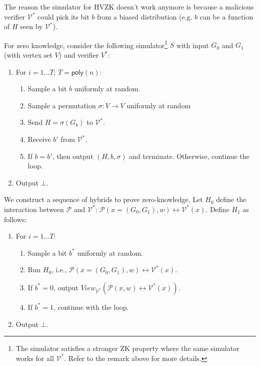 The reason the simulator for HVZK doesn't work anymore is because a malicious verifier $\mathcal{V^*}$ could pick its bit $b$ from a biased distribution (e.g. $b$ can be a function of $H$ seen by $\mathcal{V^*}$).

For zero knowledge, consider the following simulator\footnote{The simulator satisfies a stronger ZK property where the same simulator works for all $\mathcal{V^*}$. Refer to the remark above for more details.} $S$ with input $G_0$ and $G_1$ (with vertex set $V$) and verifier $V^*$:

\begin{enumerate}
\item For $i = 1\dots T$; $T=\mathsf{poly}(n)$:
\begin{enumerate}
	\item Sample a bit $b$ uniformly at random.

	\item Sample a permutation $\sigma: V \to V$ uniformly at random
	
	\item Send $H = \sigma (G_b)$ to $\mathcal{V^*}$.

	\item Receive $b'$ from $\mathcal{V^*}$.

	\item If $b=b'$, then output $(H, b, \sigma)$ and terminate. Otherwise, continue the loop.
\end{enumerate}
\item Output $\bot$.

\end{enumerate}

We construct a sequence of hybrids to prove zero-knowledge. Let $H_0$ define the interaction between $\mathcal{P}$ and $\mathcal{V^*}$: $\mathcal{P}(x=(G_0, G_1), w)\leftrightarrow \mathcal{V^*}(x)$. Define $H_1$ as follows: 
\begin{enumerate}
	\item For $i = 1\dots T$:
\begin{enumerate}
	\item Sample a bit $b^*$ uniformly at random.

	\item Run $H_0$, i.e., $\mathcal{P}(x=(G_0, G_1), w)\leftrightarrow \mathcal{V^*}(x)$.
	
	\item If $b^*=0$, output $View_{\mathcal{V^*}}(\mathcal{P}(x,w) \leftrightarrow \mathcal{V^*}(x))$.
	
	\item If $b^*=1$, continue with the loop.
\end{enumerate}
\item Output $\bot$.
\end{enumerate}

